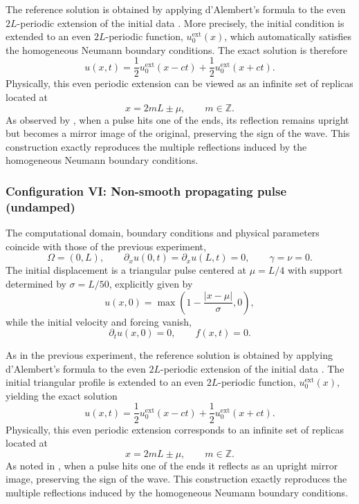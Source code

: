 \documentclass{Configuration_Files/PoliMi3i_thesis}
\begin{document}
The reference solution is obtained by applying d'Alembert's formula to the even $2L$-periodic extension of the initial data \cite[Sec.~4.2]{olver_introduction_2014}. More precisely, the initial condition is extended to an even $2L$-periodic function, $u_0^{\mathrm{ext}}(x)$, which automatically satisfies the homogeneous Neumann boundary conditions. The exact solution is therefore
\[
u(x,t)
=
\frac12
u_0^{\mathrm{ext}}(x-ct)
+
\frac12
u_0^{\mathrm{ext}}(x+ct).
\]
Physically, this even periodic extension can be viewed as an infinite set of replicas located at
\[
x=2mL\pm\mu,
\qquad
m\in\mathbb Z.
\]
As observed by \citet[Sec.~4.2]{olver_introduction_2014}, when a pulse hits one of the ends, its reflection remains upright but becomes a mirror image of the original, preserving the sign of the wave. This construction exactly reproduces the multiple reflections induced by the homogeneous Neumann boundary conditions. 

\subsubsection{Configuration VI: Non-smooth propagating pulse (undamped)}
The computational domain, boundary conditions and physical parameters coincide with those of the previous experiment,
\[
\Omega=(0,L),\qquad
\partial_xu(0,t)=\partial_xu(L,t)=0,\qquad
\gamma=\nu=0.
\]
The initial displacement is a triangular pulse centered at $\mu = L/4$ with support determined by $\sigma = L/50$, explicitly given by
\[
u(x,0) = \max\left(1 - \frac{|x-\mu|}{\sigma}, 0\right),
\]
while the initial velocity and forcing vanish,
\[
\partial_tu(x,0)=0,
\qquad
f(x,t)=0.
\]

As in the previous experiment, the reference solution is obtained by applying d'Alembert's formula to the even $2L$-periodic extension of the initial data \cite[Sec.~4.2]{olver_introduction_2014}. The initial triangular profile is extended to an even $2L$-periodic function, $u_0^{\mathrm{ext}}(x)$, yielding the exact solution
\[
u(x,t)
=
\frac12
u_0^{\mathrm{ext}}(x-ct)
+
\frac12
u_0^{\mathrm{ext}}(x+ct).
\]
Physically, this even periodic extension corresponds to an infinite set of replicas located at
\[
x=2mL\pm\mu,
\qquad
m\in\mathbb Z.
\]
As noted in \cite[Sec.~4.2]{olver_introduction_2014}, when a pulse hits one of the ends it reflects as an upright mirror image, preserving the sign of the wave. This construction exactly reproduces the multiple reflections induced by the homogeneous Neumann boundary conditions. 
\end{document}
